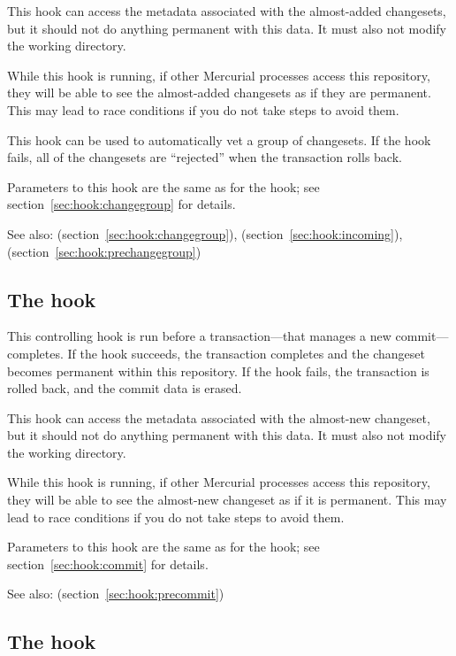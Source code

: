 This hook can access the metadata associated with the almost-added
changesets, but it should not do anything permanent with this data.
It must also not modify the working directory.

While this hook is running, if other Mercurial processes access this
repository, they will be able to see the almost-added changesets as if
they are permanent.  This may lead to race conditions if you do not
take steps to avoid them.

This hook can be used to automatically vet a group of changesets.  If
the hook fails, all of the changesets are ``rejected'' when the
transaction rolls back.

Parameters to this hook are the same as for the 
hook; see section~\ref{sec:hook:changegroup} for details.

See also:  (section~\ref{sec:hook:changegroup}),
 (section~\ref{sec:hook:incoming}),
 (section~\ref{sec:hook:prechangegroup})

\subsection{The  hook}
\label{sec:hook:pretxncommit}

This controlling hook is run before a transaction---that manages a new
commit---completes.  If the hook succeeds, the transaction completes
and the changeset becomes permanent within this repository.  If the
hook fails, the transaction is rolled back, and the commit data is
erased.

This hook can access the metadata associated with the almost-new
changeset, but it should not do anything permanent with this data.  It
must also not modify the working directory.

While this hook is running, if other Mercurial processes access this
repository, they will be able to see the almost-new changeset as if it
is permanent.  This may lead to race conditions if you do not take
steps to avoid them.

Parameters to this hook are the same as for the  hook;
see section~\ref{sec:hook:commit} for details.

See also:  (section~\ref{sec:hook:precommit})

\subsection{The  hook}
\label{sec:hook:preupdate}

